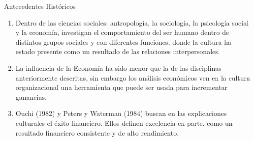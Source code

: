 \documentclass[aspectratio=169]{beamer}
\begin{document}
	\begin{frame}{Antecedentes Históricos}
		\begin{enumerate}
			\item Dentro de las ciencias sociales: antropología, la sociología, la psicología social y la economía, investigan el comportamiento del ser humano dentro de distintos grupos sociales y con diferentes funciones, donde la cultura ha estado presente como un resultado de las relaciones interpersonales. 
			
			\item La influencia de la Economía ha sido menor que la de las disciplinas anteriormente descritas, sin embargo los análisis económicos ven en la cultura organizacional una herramienta que puede ser usada para incrementar ganancias. 
			
			\item Ouchi (1982) y Peters y Waterman (1984) buscan en las explicaciones culturales el éxito financiero. Ellos definen excelencia en parte, como un resultado financiero consistente y de alto rendimiento. 
			
			
			
		\end{enumerate}
	\end{frame}
	
\end{document}
